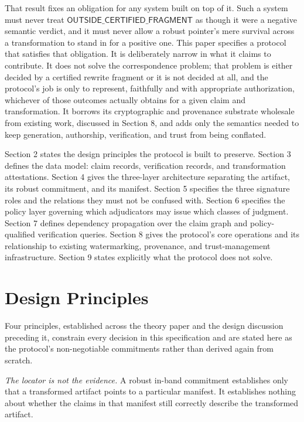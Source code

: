 \documentclass[11pt]{article}
\begin{document}
That result fixes an obligation for any system built on top of it. Such a system must never treat $\textsf{OUTSIDE\_CERTIFIED\_FRAGMENT}$ as though it were a negative semantic verdict, and it must never allow a robust pointer's mere survival across a transformation to stand in for a positive one. This paper specifies a protocol that satisfies that obligation. It is deliberately narrow in what it claims to contribute. It does not solve the correspondence problem; that problem is either decided by a certified rewrite fragment or it is not decided at all, and the protocol's job is only to represent, faithfully and with appropriate authorization, whichever of those outcomes actually obtains for a given claim and transformation. It borrows its cryptographic and provenance substrate wholesale from existing work, discussed in Section 8, and adds only the semantics needed to keep generation, authorship, verification, and trust from being conflated.

Section 2 states the design principles the protocol is built to preserve. Section 3 defines the data model: claim records, verification records, and transformation attestations. Section 4 gives the three-layer architecture separating the artifact, its robust commitment, and its manifest. Section 5 specifies the three signature roles and the relations they must not be confused with. Section 6 specifies the policy layer governing which adjudicators may issue which classes of judgment. Section 7 defines dependency propagation over the claim graph and policy-qualified verification queries. Section 8 gives the protocol's core operations and its relationship to existing watermarking, provenance, and trust-management infrastructure. Section 9 states explicitly what the protocol does not solve.

\section{Design Principles}

Four principles, established across the theory paper and the design discussion preceding it, constrain every decision in this specification and are stated here as the protocol's non-negotiable commitments rather than derived again from scratch.

\emph{The locator is not the evidence.} A robust in-band commitment establishes only that a transformed artifact points to a particular manifest. It establishes nothing about whether the claims in that manifest still correctly describe the transformed artifact.
\end{document}
